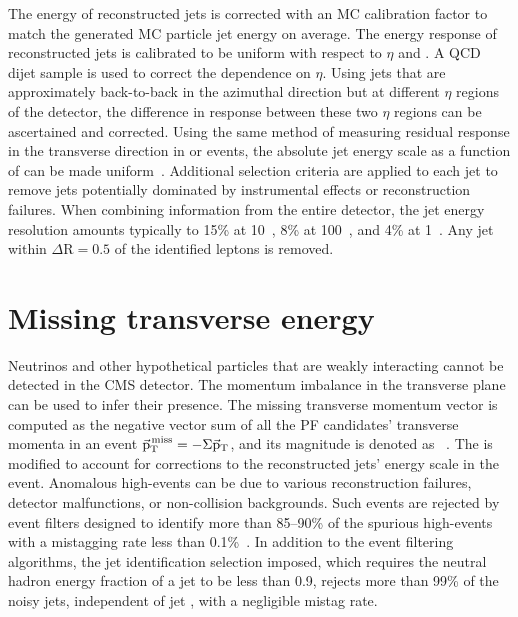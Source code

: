The energy of reconstructed jets is corrected with an MC calibration factor to match the generated MC particle jet energy on average. The energy response of reconstructed jets is calibrated to be uniform with respect to $\eta$ and \pt. A QCD dijet sample is used to correct the dependence on $\eta$. Using jets that are approximately back-to-back in the azimuthal direction but at different $\eta$ regions of the detector, the difference in response between these two $\eta$ regions can be ascertained and corrected. Using the same method of measuring residual response in the transverse direction in \gjets or \zjets events, the absolute jet energy scale as a function of \pt can be made uniform~\cite{Khachatryan:2016kdb}. Additional selection criteria are applied to each jet to remove jets potentially dominated by instrumental effects or reconstruction failures. When combining information from the entire detector, the jet energy resolution amounts typically to 15\% at 10~\GeV, 8\% at 100~\GeV, and 4\% at 1~\TeV. Any jet within $\Delta\text{R}=0.5$ of the identified leptons is removed.


\section{Missing transverse energy}

Neutrinos and other hypothetical particles that are weakly interacting cannot be detected in the CMS detector. The momentum imbalance in the transverse plane can be used to infer their presence. The missing transverse momentum vector \ptvecmiss is computed as the negative vector sum of all the PF candidates' transverse momenta in an event ${\vec{\text{p}}}_{\mathrm{T}}^{\kern1pt\text{miss}} = -\Sigma{\vec{\mathrm{p}}}_{\mathrm{T}}$, and its magnitude is denoted as \ptmiss~\cite{Sirunyan:2019kia}. The \ptvecmiss is modified to account for corrections to the reconstructed jets' energy scale in the event. Anomalous high-\ptmiss events can be due to various reconstruction failures, detector malfunctions, or non-collision backgrounds. Such events are rejected by event filters designed to identify more than 85--90\% of the spurious high-\ptmiss events with a mistagging rate less than 0.1\%~\cite{Sirunyan:2019kia}. In addition to the event filtering algorithms, the jet identification selection imposed, which requires the neutral hadron energy fraction of a jet to be less than 0.9, rejects more than 99\% of the noisy jets, independent of jet \pt, with a negligible mistag rate.

